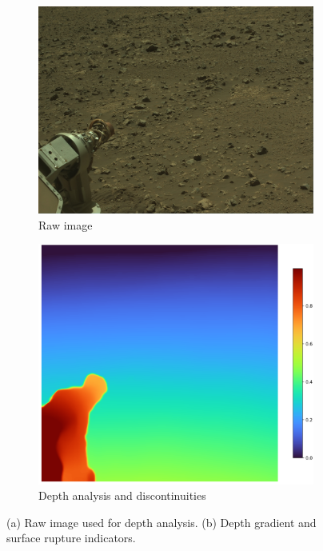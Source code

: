 \documentclass[12pt]{article}
\begin{document}
\begin{figure}[H]
  \centering
  \begin{subfigure}[t]{0.49\textwidth}
    \centering
    \includegraphics[width=\linewidth]{Mars_Perseverance_Rover_Sands.png}
    \caption{Raw image}
  \end{subfigure}\hfill
  \begin{subfigure}[t]{0.49\textwidth}
    \centering
    \includegraphics[width=\linewidth]{Mars_Perseverance_Rover_Sands_depth_analsys2.png}
    \caption{Depth analysis and discontinuities}
  \end{subfigure}
  \caption{(a) Raw image used for depth analysis. (b) Depth gradient and surface rupture indicators.}
  \label{fig:depth-rover}
\end{figure}
\FloatBarrier
\end{document}
